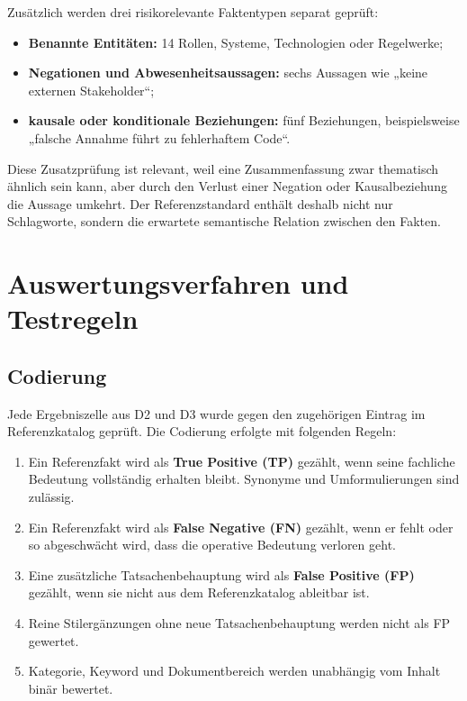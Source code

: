 \documentclass[
  10pt,
  ngerman,
  a4paper,
  toc=graduated,
  numbers=noenddot,
  headings=standardclasses
]{scrartcl}
\begin{document}
Zusätzlich werden drei risikorelevante Faktentypen separat geprüft:

\begin{itemize}
  \item \textbf{Benannte Entitäten:} 14 Rollen, Systeme, Technologien oder Regelwerke;
  \item \textbf{Negationen und Abwesenheitsaussagen:} sechs Aussagen wie „keine externen Stakeholder“;
  \item \textbf{kausale oder konditionale Beziehungen:} fünf Beziehungen, beispielsweise „falsche Annahme führt zu fehlerhaftem Code“.
\end{itemize}

Diese Zusatzprüfung ist relevant, weil eine Zusammenfassung zwar thematisch ähnlich sein kann, aber durch den Verlust einer Negation oder Kausalbeziehung die Aussage umkehrt. Der Referenzstandard enthält deshalb nicht nur Schlagworte, sondern die erwartete semantische Relation zwischen den Fakten.

\newpage
\section{Auswertungsverfahren und Testregeln}

\subsection{Codierung}

Jede Ergebniszelle aus D2 und D3 wurde gegen den zugehörigen Eintrag im Referenzkatalog geprüft. Die Codierung erfolgte mit folgenden Regeln:

\begin{enumerate}
  \item Ein Referenzfakt wird als \textbf{True Positive (TP)} gezählt, wenn seine fachliche Bedeutung vollständig erhalten bleibt. Synonyme und Umformulierungen sind zulässig.
  \item Ein Referenzfakt wird als \textbf{False Negative (FN)} gezählt, wenn er fehlt oder so abgeschwächt wird, dass die operative Bedeutung verloren geht.
  \item Eine zusätzliche Tatsachenbehauptung wird als \textbf{False Positive (FP)} gezählt, wenn sie nicht aus dem Referenzkatalog ableitbar ist.
  \item Reine Stilergänzungen ohne neue Tatsachenbehauptung werden nicht als FP gewertet.
  \item Kategorie, Keyword und Dokumentbereich werden unabhängig vom Inhalt binär bewertet.
\end{enumerate}
\end{document}
